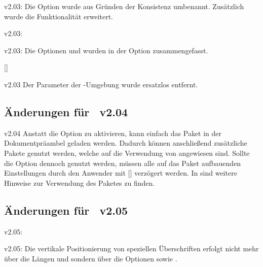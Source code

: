 \begin{Obsolete}{v2.03:}{}
\printobsoletelist%
%
Die Option  wurde aus Gründen der Konsistenz umbenannt. 
Zusätzlich wurde die Funktionalität erweitert.
\end{Obsolete}

\begin{Obsolete}{v2.03:}{}
\begin{Obsolete}{v2.03:}{}
\printobsoletelist%
%
Die Optionen  und  wurden in der Option 
 zusammengefasst.
\end{Obsolete}
\end{Obsolete}

\begin{Obsolete}{}{[]}
\begin{Obsolete}{v2.03}{}
\printobsoletelist%
%
Der Parameter  der 
-Umgebung wurde ersatzlos entfernt.
\end{Obsolete}
\end{Obsolete}


%
\subsection{Änderungen für \TUDScript~v2.04}
\begin{Obsolete}{v2.04}{}%
\printobsoletelist%
%
Anstatt die Option  zu aktivieren, kann einfach das Paket 
 in der Dokumentpräambel geladen werden. Dadurch können 
anschließend zusätzliche Pakete genutzt werden, welche auf die Verwendung von 
 angewiesen sind. Sollte die Option  
dennoch genutzt werden, müssen alle auf das Paket  
aufbauenden Einstellungen durch den Anwender mit 
[\PParameter{\dots}] 
verzögert werden. In  sind weitere Hinweise zur 
Verwendung des Paketes  zu finden.
\end{Obsolete}


%
\subsection{Änderungen für \TUDScript~v2.05}
\begin{Obsolete}{v2.05:}{}
\begin{Obsolete}{v2.05:}{}
\printobsoletelist%
%
Die vertikale Positionierung von speziellen Überschriften erfolgt nicht mehr 
über die Längen  und  sondern 
über die Optionen  sowie .
\end{Obsolete}
\end{Obsolete}


